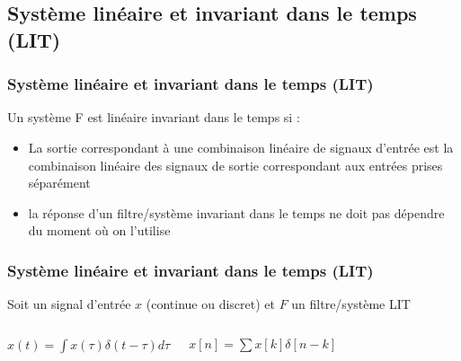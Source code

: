 \documentclass{beamer}
\begin{document}
\subsection{Système linéaire et invariant dans le  temps (LIT)}

\begin{frame}
\frametitle{Système linéaire et invariant dans le  temps (LIT) }

Un système F est linéaire invariant dans le temps si :
\begin{itemize}
\item La sortie correspondant à une combinaison linéaire de signaux d'entrée est la combinaison linéaire des signaux de sortie correspondant aux entrées prises séparément\\
\item la réponse d'un filtre/système invariant dans le temps ne doit pas dépendre du moment où on l'utilise\\
\end{itemize}

\end{frame} 

\begin{frame} 
\frametitle{Système linéaire et invariant dans le temps (LIT) }
Soit un signal d'entrée $x$ (continue ou discret) et $F$ un filtre/système LIT\\
\vspace{1 cm}
\begin{columns}
\column{70mm}
\begin{center}
$x(t) = \displaystyle \int x(\tau) \delta(t-\tau) d\tau$\\

\end{center}

\column{60mm}
\begin{center}
$x[n] =  \displaystyle \sum x[k] \delta[n-k] $ \\
\vspace{0.5cm}



\end{center}
\end{columns}
\end{frame}
\end{document}
